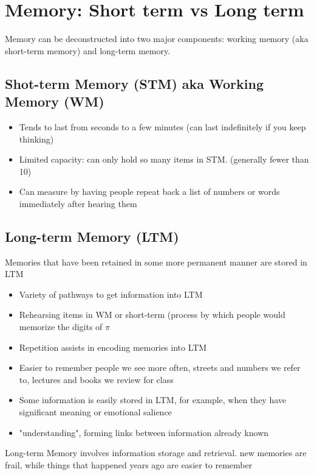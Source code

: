 \documentclass{article}
\begin{document}
\newpage
\section{Memory: Short term vs Long term}
Memory can be deconstructed into two major components: working memory (aka short-term memory) and long-term memory. \\ 

\subsection{Shot-term Memory (STM) aka Working Memory (WM)}
\begin{itemize}
    \item Tends to last from seconds to a few minutes (can last indefinitely if you keep thinking) 
    \item Limited capacity: can only hold so many items in STM. (generally fewer than 10) 
    \item Can measure by having people repeat back a list of numbers or words immediately after hearing them
\end{itemize}

\subsection{Long-term Memory (LTM)}
Memories that have been retained in some more permanent manner are stored in LTM
\begin{itemize}
    \item Variety of pathways to get information into LTM
    \item Rehearsing items in WM or short-term (process by which people would memorize the digits of $\pi$
    \item Repetition assists in encoding memories into LTM
    \item Easier to remember people we see more often, streets and numbers we refer to, lectures and books we review for class
    \item Some information is easily stored in LTM, for example, when they have significant meaning or emotional salience
    \item "understanding", forming links between information already known
\end{itemize}

\noindent Long-term Memory involves information storage and retrieval. new memories are frail, while things that happened years ago are easier to remember\\
\end{document}

